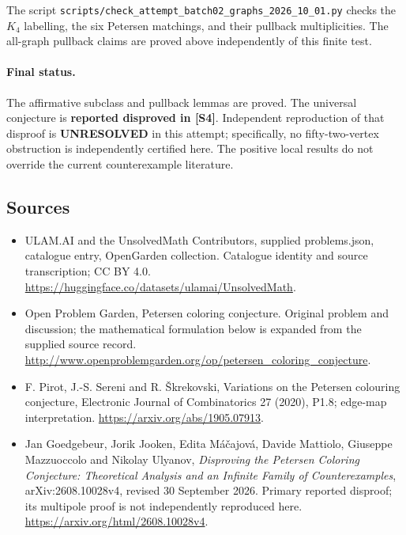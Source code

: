 \documentclass[11pt,a4paper]{article}
\begin{document}
The script \texttt{scripts/check\_attempt\_batch02\_graphs\_2026\_10\_01.py} checks the $K_4$ labelling, the six Petersen matchings, and their pullback multiplicities. The all-graph pullback claims are proved above independently of this finite test.

\paragraph{Final status.}
The affirmative subclass and pullback lemmas are proved. The universal conjecture is \textbf{reported disproved in [S4]}. Independent reproduction of that disproof is \textbf{UNRESOLVED} in this attempt; specifically, no fifty-two-vertex obstruction is independently certified here. The positive local results do not override the current counterexample literature.

\subsection{Sources}
\begin{itemize}
\item[S1] ULAM.AI and the UnsolvedMath Contributors, supplied problems.json, catalogue entry, OpenGarden collection. Catalogue identity and source transcription; CC BY 4.0.
\url{https://huggingface.co/datasets/ulamai/UnsolvedMath}.
\item[S2] Open Problem Garden, Petersen coloring conjecture. Original problem and discussion; the mathematical formulation below is expanded from the supplied source record.
\url{http://www.openproblemgarden.org/op/petersen_coloring_conjecture}.
\item[S3] F. Pirot, J.-S. Sereni and R. Škrekovski, Variations on the Petersen colouring conjecture, Electronic Journal of Combinatorics 27 (2020), P1.8; edge-map interpretation.
\url{https://arxiv.org/abs/1905.07913}.
\item[S4] Jan Goedgebeur, Jorik Jooken, Edita M\'a\v cajov\'a, Davide Mattiolo, Giuseppe Mazzuoccolo and Nikolay Ulyanov, \emph{Disproving the Petersen Coloring Conjecture: Theoretical Analysis and an Infinite Family of Counterexamples}, arXiv:2608.10028v4, revised 30 September 2026. Primary reported disproof; its multipole proof is not independently reproduced here.
\url{https://arxiv.org/html/2608.10028v4}.
\end{itemize}
\end{document}
